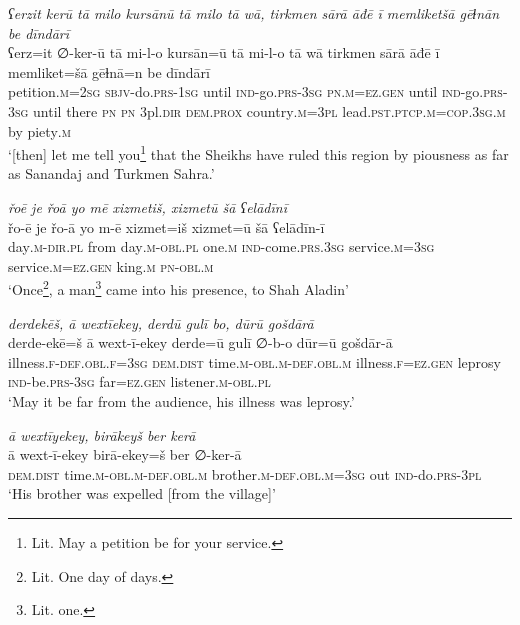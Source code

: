 \ea \label{DG.10}
\textit{ʕerzit kerū tā milo kursānū tā milo tā wā, tirkmen sārā āđē ī memliketšā gēɫnān be dīndārī} \\ 
\gll ʕerz=it ∅-ker-ū tā mi-l-o kursān=ū tā mi-l-o tā wā tirkmen sārā āđē ī memliket=šā gēɫnā=n be dīndārī \\ 
 petition\textsc{.m}\textsc{=\textsc{2sg}} \textsc{sbjv-}do\textsc{.prs}\textsc{-1sg} until \textsc{ind-}go\textsc{.prs}\textsc{-3sg} \textsc{pn}\textsc{.m}\textsc{=ez}\textsc{.gen} until \textsc{ind-}go\textsc{.prs}\textsc{-3sg} until there \textsc{pn} \textsc{pn} 3pl\textsc{.dir} \textsc{dem.prox} country\textsc{.m}\textsc{=3pl} lead\textsc{.pst}\textsc{.ptcp}\textsc{.m}\textsc{=cop}\textsc{.3sg}\textsc{.m} by piety\textsc{.m} \\ 
\glt `[then] let me tell you\footnote{Lit. May a petition be for your service.} that the Sheikhs have ruled this region by piousness as far as Sanandaj and Turkmen Sahra.'
\z 
 
\ea \label{DG.11}
\textit{řoē je řoā yo mē xizmetiš, xizmetū šā ʕelādīnī} \\ 
\gll řo-ē je řo-ā yo m-ē xizmet=iš xizmet=ū šā ʕelādīn-ī \\ 
 day\textsc{.m}\textsc{-dir}\textsc{.pl} from day\textsc{.m}\textsc{-obl}\textsc{.pl} one\textsc{.m} \textsc{ind-}come\textsc{.prs}\textsc{.3sg} service\textsc{.m}\textsc{=3sg} service\textsc{.m}\textsc{=ez}\textsc{.gen} king\textsc{.m} \textsc{pn}\textsc{-obl}\textsc{.m} \\ 
\glt `Once\footnote{Lit. One day of days.}, a man\footnote{Lit. one.}  came into his presence, to Shah Aladin'
\z 
 
\ea \label{DG.13}
\textit{derdekēš, ā wextīekey, derdū gulī bo, dūrū gošdārā} \\ 
\gll derde-ekē=š ā wext-ī-ekey derde=ū gulī ∅-b-o dūr=ū gošdār-ā \\ 
 illness\textsc{\textsc{.f}}\textsc{-def}\textsc{.obl}\textsc{\textsc{.f}}\textsc{=3sg} \textsc{dem.dist} time\textsc{.m}\textsc{-obl}\textsc{.m}\textsc{-def}\textsc{.obl}\textsc{.m} illness\textsc{\textsc{.f}}\textsc{=ez}\textsc{.gen} leprosy \textsc{ind-}be\textsc{.prs}\textsc{-3sg} far\textsc{=ez}\textsc{.gen} listener\textsc{.m}\textsc{-obl}\textsc{.pl} \\ 
\glt `May it be far from the audience, his illness was leprosy.'
\z 
 
\ea \label{DG.15}
\textit{ā wextīyekey, birākeyš ber kerā} \\ 
\gll ā wext-ī-ekey birā-ekey=š ber ∅-ker-ā \\ 
 \textsc{dem.dist} time\textsc{.m}\textsc{-obl}\textsc{.m}\textsc{-def}\textsc{.obl}\textsc{.m} brother\textsc{.m}\textsc{-def}\textsc{.obl}\textsc{.m}\textsc{=3sg} out \textsc{ind-}do\textsc{.prs}\textsc{-3pl} \\ 
\glt `His brother was expelled [from the village]'
\z 
 

